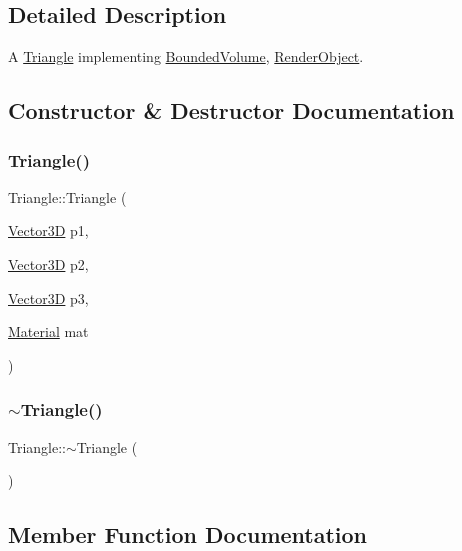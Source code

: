 \subsection{Detailed Description}
A \mbox{\hyperlink{classTriangle}{Triangle}} implementing \mbox{\hyperlink{classBoundedVolume}{Bounded\+Volume}}, \mbox{\hyperlink{classRenderObject}{Render\+Object}}. 

\subsection{Constructor \& Destructor Documentation}
\mbox{\label{classTriangle_a4a1cc7d9d62014eb2453d18bbd05608f}} 
\subsubsection{\texorpdfstring{Triangle()}{Triangle()}}
{\footnotesize\ttfamily Triangle\+::\+Triangle (\begin{DoxyParamCaption}\item[{\mbox{\hyperlink{classVector3D}{Vector3D}}}]{p1,  }\item[{\mbox{\hyperlink{classVector3D}{Vector3D}}}]{p2,  }\item[{\mbox{\hyperlink{classVector3D}{Vector3D}}}]{p3,  }\item[{\mbox{\hyperlink{classMaterial}{Material}}}]{mat }\end{DoxyParamCaption})}

\mbox{\label{classTriangle_a2b4c058428898080754e39009819ca38}} 
\subsubsection{\texorpdfstring{$\sim$Triangle()}{~Triangle()}}
{\footnotesize\ttfamily Triangle\+::$\sim$\+Triangle (\begin{DoxyParamCaption}{ }\end{DoxyParamCaption})\hspace{0.3cm}{\ttfamily [default]}}



\subsection{Member Function Documentation}
\mbox{\label{classTriangle_ab1f861b8e31d8560cf80c58e4dbf560f}} 
